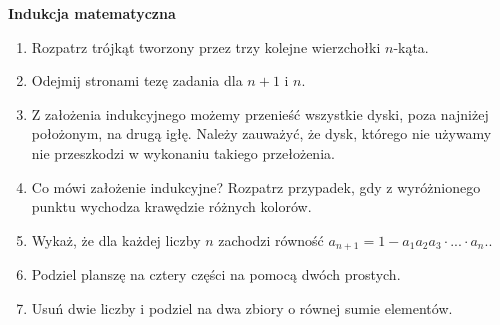 \newpage
\begin{center}
	\textbf{Indukcja matematyczna}
\end{center}

\begin{enumerate}
	\item Rozpatrz trójkąt tworzony przez trzy kolejne wierzchołki $n$-kąta.

	\item Odejmij stronami tezę zadania dla $n + 1$ i $n$.

	\item
	Z założenia indukcyjnego możemy przenieść wszystkie dyski, poza najniżej położonym, na drugą igłę. Należy zauważyć, że dysk, którego nie używamy nie przeszkodzi w wykonaniu takiego przełożenia.

	\item Co mówi założenie indukcyjne? Rozpatrz przypadek, gdy z wyróżnionego punktu wychodza krawędzie różnych kolorów.

	\item Wykaż, że dla każdej liczby $n$ zachodzi równość $a_{n + 1} = 1 - a_1a_2a_3\cdot ... \cdot a_{n}.$.

	\item Podziel planszę na cztery części na pomocą dwóch prostych.

	\item Usuń dwie liczby i podziel na dwa zbiory o równej sumie elementów.
\end{enumerate}